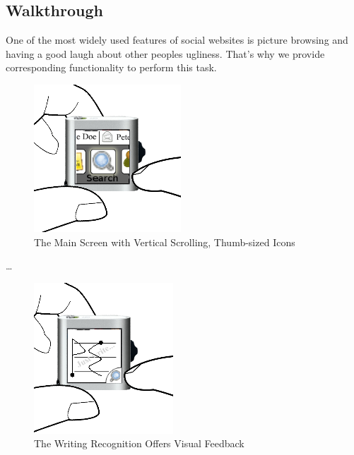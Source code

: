 %
%
% 

\subsection{Walkthrough}

One of the most widely used features of social websites is picture browsing 
and having a good laugh about other peoples ugliness.
That's why we provide corresponding functionality to perform this task.
%
\begin{figure}[h]
  \begin{center}
    \includegraphics[width=0.6\linewidth]{imgs/wt1.png}
  \end{center}
  \caption{The Main Screen with Vertical Scrolling, Thumb-sized Icons}
  \label{fig:main}
\end{figure}
%
\ldots
%
\begin{figure}[h]
  \begin{center}
    \includegraphics[width=0.6\linewidth]{imgs/wt2.png}
  \end{center}
  \caption{The Writing Recognition Offers Visual Feedback}
  \label{fig:main}
\end{figure}

